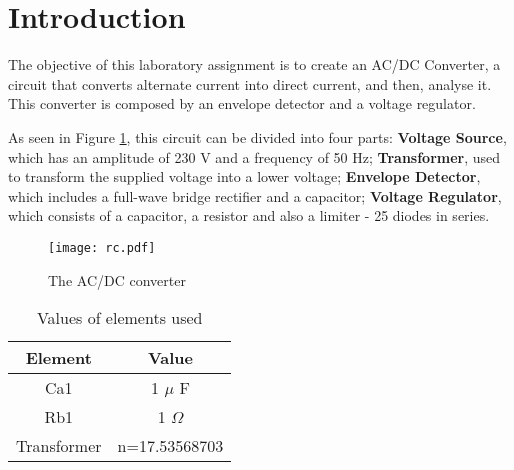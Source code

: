 \section{Introduction}
\label{sec:introduction}

The objective of this laboratory assignment is to create an AC/DC Converter, a circuit that converts alternate current into direct current, and then, analyse it. This converter is composed by an envelope detector and a voltage regulator.

As seen in Figure \ref{fig:rc}, this circuit can be divided into four parts: \textbf{Voltage Source}, which has an amplitude of 230 V and a frequency of 50 Hz; \textbf{Transformer}, used to transform the supplied voltage into a lower voltage; \textbf{Envelope Detector}, which includes a full-wave bridge rectifier and a capacitor; \textbf{Voltage Regulator}, which consists of a capacitor, a resistor and also a limiter - 25 diodes in series.


\begin{figure}[h] \centering
\texttt{[image: rc.pdf]}
\vspace{-5mm}
\caption{The AC/DC converter}
\label{fig:rc}
\end{figure}

\begin{table}[h]
  \centering
  \begin{tabular}{|c|c|}
    \hline    
    Element &  Value \\ \hline
    Ca1 & 1 $\mu$ F \\ \hline
    Rb1 & 1 $\Omega$ \\ \hline
    Transformer & n=17.53568703 \\ \hline
    
 \end{tabular}
 \caption{Values of elements used}
  \label{tab:op2}
\end{table}






